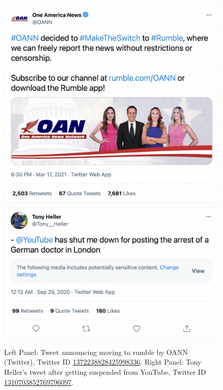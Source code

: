 \documentclass{article}
\begin{document}
\begin{figure}[h]
	\centering
		\includegraphics[scale=0.21]{./img/oann/fig3_oann.png}
		\includegraphics[scale=0.31]{./img/tony/fig3_tony.png}
	\caption{Left Panel: Tweet announcing moving to rumble by OANN (Twitter), Twitter ID \href{https://twitter.com/OANN/status/1372238828425998336}{1372238828425998336}. Right Panel: Tony Heller's tweet after getting suspended from YouTube, Twitter ID \href{https://twitter.com/Tony\_Heller/status/1310703852769796097}{1310703852769796097}.}
	\label{fig2_oann}
\end{figure}
\end{document}
